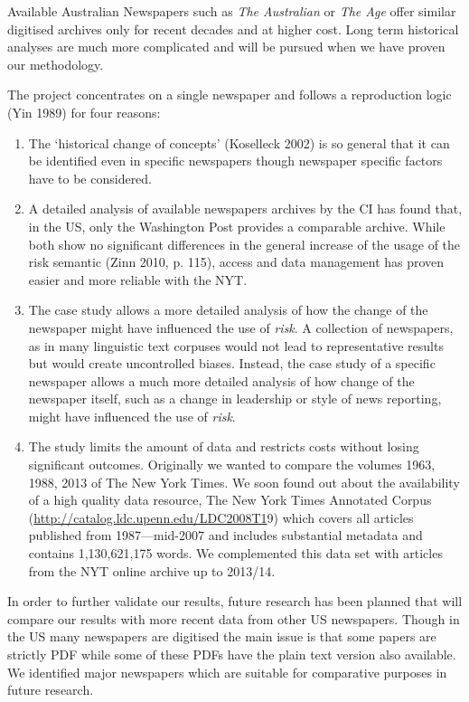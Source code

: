 \documentclass{report}
\begin{document}
Available Australian Newspapers such as \emph{The Australian} or \emph{The Age} offer similar digitised archives only for recent decades and at higher cost. Long term historical analyses are much more complicated and will be pursued when we have proven our methodology.


The project concentrates on a single newspaper and follows a reproduction logic (Yin 1989) for four reasons: 

\begin{enumerate}
\item The `historical change of concepts' (Koselleck 2002) is so general that it can be identified even in specific newspapers though newspaper specific factors have to be considered. 
\item A detailed analysis of available newspapers archives by the CI has found that, in the US, only the Washington Post provides a comparable archive. While both show no significant differences in the general increase of the usage of the risk semantic (Zinn 2010, p. 115), access and data management has proven easier and more reliable with the NYT. 
\item The case study allows a more detailed analysis of how the change of the newspaper might have influenced the use of \emph{risk}. A collection of newspapers, as in many linguistic text corpuses would not lead to representative results but would create uncontrolled biases. Instead, the case study of a specific newspaper allows a much more detailed analysis of how change of the newspaper itself, such as a change in leadership or style of news reporting, might have influenced the use of \emph{risk}.
\item The study limits the amount of data and restricts costs without losing significant outcomes.
Originally we wanted to compare the volumes 1963, 1988, 2013 of The New York Times. We soon found out about the availability of a high quality data resource, The New York Times Annotated Corpus (\url{http://catalog.ldc.upenn.edu/LDC2008T1}9) which covers all articles published from 1987---mid-2007 and includes substantial metadata and contains 1,130,621,175 words. We complemented this data set with articles from the NYT online archive up to 2013\slash 14.
\end{enumerate}
%
In order to further validate our results, future research has been planned that will compare our results with more recent data from other US newspapers. Though in the US many newspapers are digitised the main issue is that some papers are strictly PDF while some of these PDFs have the plain text version also available. We identified major newspapers which are suitable for comparative purposes in future research. %
\end{document}
